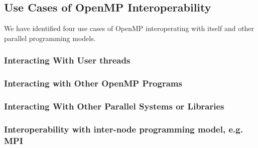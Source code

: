 
\subsection{Use Cases of OpenMP Interoperability}
We have identified four use cases of OpenMP interoperating with itself and other parallel programming models. 
\subsubsection{Interacting With User threads}


\subsubsection{Interacting with Other OpenMP Programs}


\subsubsection{Interacting With Other Parallel Systems or Libraries}


\subsubsection{Interoperability with inter-node programming model, e.g. MPI}





